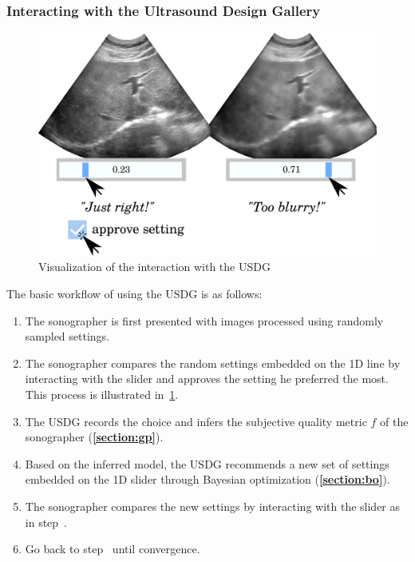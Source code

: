 \subsubsection{Interacting with the Ultrasound Design Gallery}
%
\begin{figure}[t]
  \centering
  \includegraphics[scale=0.27]{figures/ui_interaction.pdf}
  \caption{Visualization of the interaction with the USDG}\label{fig:interaction}
\end{figure}
%
The basic workflow of using the USDG is as follows:
\begin{enumerate}
\item[\ding{182}] The sonographer is first presented with images processed using randomly sampled settings.
\item[\ding{183}] The sonographer compares the random settings embedded on the 1D line by interacting with the slider and approves the setting he preferred the most. This process is illustrated in~\cref{fig:interaction}.
\item[\ding{184}] The USDG records the choice and infers the subjective quality metric \(f\) of the sonographer (\textbf{\cref{section:gp}}).
\item[\ding{185}] Based on the inferred model, the USDG recommends a new set of settings embedded on the 1D slider through Bayesian optimization (\textbf{\cref{section:bo}}).
\item[\ding{186}] The sonographer compares the new settings by interacting with the slider as in step~.
\item[\ding{187}] Go back to step~ until convergence.
\end{enumerate}

